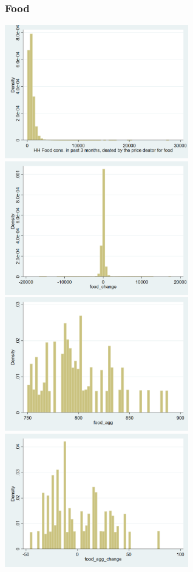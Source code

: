 \documentclass[12pt,a4paper]{article}
\begin{document}
\subsubsection*{Food}
\begin{center}
\includegraphics[width=8cm]{food.png}
\includegraphics[width=8cm]{food_change.png}\\
\includegraphics[width=8cm]{food_agg.png}
\includegraphics[width=8cm]{food_agg_change.png}\\

\end{center}
\end{document}

